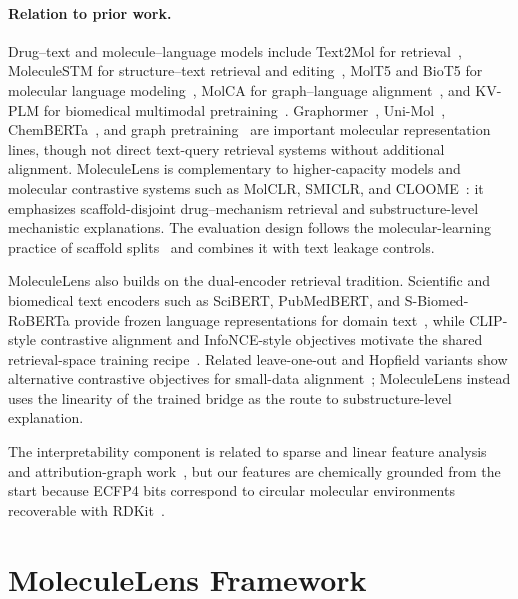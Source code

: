 \documentclass{article}
\begin{document}
\paragraph{Relation to prior work.}
Drug--text and molecule--language models include Text2Mol for retrieval~\citep{edwards2021text2mol}, MoleculeSTM for structure--text retrieval and editing~\citep{liu2023moleculestm}, MolT5 and BioT5 for molecular language modeling~\citep{edwards2022molt5,pei2023biot5}, MolCA for graph--language alignment~\citep{liu2023molca}, and KV-PLM for biomedical multimodal pretraining~\citep{zeng2022kvplm}. Graphormer~\citep{ying2021graphormer}, Uni-Mol~\citep{zhou2023unimol}, ChemBERTa~\citep{chithrananda2020chemberta}, and graph pretraining~\citep{hu2020pretraining} are important molecular representation lines, though not direct text-query retrieval systems without additional alignment. MoleculeLens is complementary to higher-capacity models and molecular contrastive systems such as MolCLR, SMICLR, and CLOOME~\citep{wang2022molclr,pinheiro2022smiclr,sanchezfernandez2023cloome}: it emphasizes scaffold-disjoint drug--mechanism retrieval and substructure-level mechanistic explanations. The evaluation design follows the molecular-learning practice of scaffold splits~\citep{bemis1996frameworks} and combines it with text leakage controls.

MoleculeLens also builds on the dual-encoder retrieval tradition. Scientific and biomedical text encoders such as SciBERT, PubMedBERT, and S-Biomed-RoBERTa provide frozen language representations for domain text~\citep{beltagy2019scibert,gu2021pubmedbert,deka2021sbiomed}, while CLIP-style contrastive alignment and InfoNCE-style objectives motivate the shared retrieval-space training recipe~\citep{radford2021clip,oord2018infonce}. Related leave-one-out and Hopfield variants show alternative contrastive objectives for small-data alignment~\citep{poole2019variational,furst2022cloob}; MoleculeLens instead uses the linearity of the trained bridge as the route to substructure-level explanation.

The interpretability component is related to sparse and linear feature analysis~\citep{bricken2023monosemanticity,templeton2024monosemanticity} and attribution-graph work~\citep{lindsey2025attribution}, but our features are chemically grounded from the start because ECFP4 bits correspond to circular molecular environments~\citep{rogers2010ecfp} recoverable with RDKit~\citep{rdkit}.

\section{MoleculeLens Framework}
\label{sec:framework}
\end{document}
